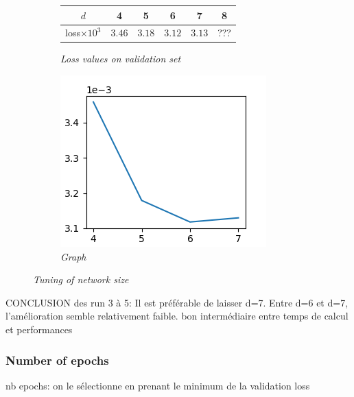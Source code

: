\documentclass{article}
\begin{document}
            \begin{figure}[!ht]
                \begin{subfigure}{.49\linewidth}
                    \center
                    \begin{tabular}{|c|c|c|c|c|c|}
                        \hline
                        $d$ & 4 & 5 & 6 & 7 & 8 \\
                        \hline \hline
                        loss$\times 10^3$ & $3.46$ & $3.18$ & $3.12$ & $3.13$ & ??? \\
                        \hline
                    \end{tabular}
                    \caption{\textit{Loss values on validation set}}
                \end{subfigure}
                \begin{subfigure}{.49\linewidth}
                    \centering
                    \includegraphics[width=.8\linewidth]{pics/hpp-d.png}
                    \caption{\textit{Graph}}
                \end{subfigure}
                \caption{\textit{Tuning of network size}}
            \end{figure}

            CONCLUSION des run 3 à 5: Il est préférable de laisser d=7. Entre d=6 et d=7, l'amélioration semble
            relativement faible.
            bon intermédiaire entre temps de calcul et performances

        \subsubsection{Number of epochs}
            nb epochs: on le sélectionne en prenant le minimum de la validation loss
\end{document}
